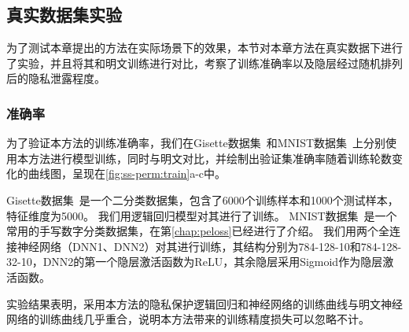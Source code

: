 \subsection{真实数据集实验}
为了测试本章提出的方法在实际场景下的效果，本节对本章方法在真实数据下进行了实验，并且将其和明文训练进行对比，考察了训练准确率以及隐层经过随机排列后的隐私泄露程度。

\subsubsection{准确率}
为了验证本方法的训练准确率，我们在Gisette数据集~\cite{2008_gisette}和MNIST数据集~\cite{mnist}上分别使用本方法进行模型训练，同时与明文对比，并绘制出验证集准确率随着训练轮数变化的曲线图，呈现在\autoref{fig:ss-perm:train}a-c中。

%
Gisette数据集~\cite{2008_gisette}是一个二分类数据集，包含了6000个训练样本和1000个测试样本，特征维度为5000。
我们用逻辑回归模型对其进行了训练。
%
MNIST数据集~\cite{mnist}是一个常用的手写数字分类数据集，在第\ref{chap:peloss}已经进行了介绍。
我们用两个全连接神经网络（DNN1、DNN2）对其进行训练，其结构分别为784-128-10和784-128-32-10，DNN2的第一个隐层激活函数为ReLU，其余隐层采用Sigmoid作为隐层激活函数。

实验结果表明，采用本方法的隐私保护逻辑回归和神经网络的训练曲线与明文神经网络的训练曲线几乎重合，说明本方法带来的训练精度损失可以忽略不计。


